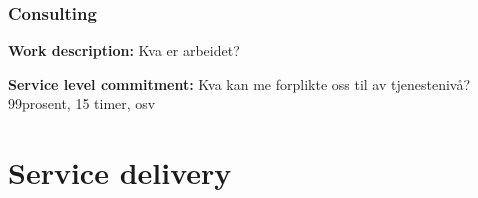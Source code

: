 \subsubsection{Consulting}
\textbf{Work description:} Kva er arbeidet?

\textbf{Service level commitment:} Kva kan me forplikte oss til av tjenestenivå? 99prosent, 15 timer, osv


\section{Service delivery}




